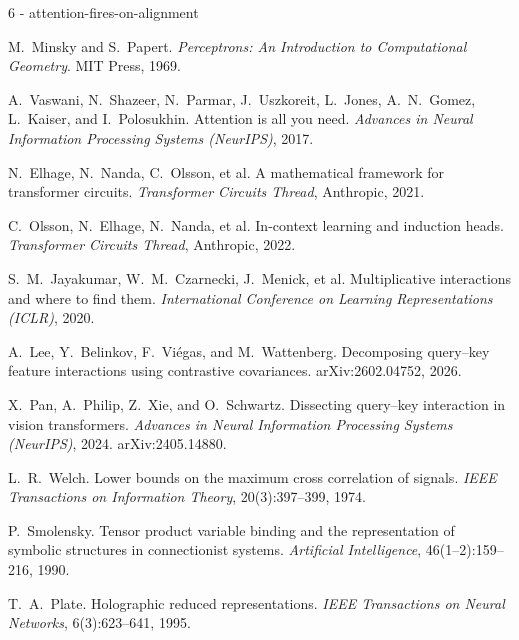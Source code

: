 \documentclass[11pt]{article}
\theoremstyle{plain}
\theoremstyle{definition}
\theoremstyle{remark}
\begin{document}
\begin{thebibliography}{6 - attention-fires-on-alignment}

M.~Minsky and S.~Papert.
\emph{Perceptrons: An Introduction to Computational Geometry}.
MIT Press, 1969.

A.~Vaswani, N.~Shazeer, N.~Parmar, J.~Uszkoreit, L.~Jones, A.~N.~Gomez, L.~Kaiser, and I.~Polosukhin.
Attention is all you need.
\emph{Advances in Neural Information Processing Systems (NeurIPS)}, 2017.

N.~Elhage, N.~Nanda, C.~Olsson, et al.
A mathematical framework for transformer circuits.
\emph{Transformer Circuits Thread}, Anthropic, 2021.

C.~Olsson, N.~Elhage, N.~Nanda, et al.
In-context learning and induction heads.
\emph{Transformer Circuits Thread}, Anthropic, 2022.

S.~M.~Jayakumar, W.~M.~Czarnecki, J.~Menick, et al.
Multiplicative interactions and where to find them.
\emph{International Conference on Learning Representations (ICLR)}, 2020.

A.~Lee, Y.~Belinkov, F.~Vi\'egas, and M.~Wattenberg.
Decomposing query--key feature interactions using contrastive covariances.
arXiv:2602.04752, 2026.

X.~Pan, A.~Philip, Z.~Xie, and O.~Schwartz.
Dissecting query--key interaction in vision transformers.
\emph{Advances in Neural Information Processing Systems (NeurIPS)}, 2024. arXiv:2405.14880.

L.~R.~Welch.
Lower bounds on the maximum cross correlation of signals.
\emph{IEEE Transactions on Information Theory}, 20(3):397--399, 1974.

P.~Smolensky.
Tensor product variable binding and the representation of symbolic structures in connectionist systems.
\emph{Artificial Intelligence}, 46(1--2):159--216, 1990.

T.~A.~Plate.
Holographic reduced representations.
\emph{IEEE Transactions on Neural Networks}, 6(3):623--641, 1995.

\end{thebibliography}
\end{document}

